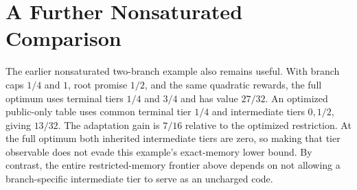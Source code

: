 \section{A Further Nonsaturated Comparison}
The earlier nonsaturated two-branch example also remains useful. With branch caps $1/4$ and $1$, root promise $1/2$, and the same quadratic rewards, the full optimum uses terminal tiers $1/4$ and $3/4$ and has value $27/32$. An optimized public-only table uses common terminal tier $1/4$ and intermediate tiers $0,1/2$, giving $13/32$. The adaptation gain is $7/16$ relative to the optimized restriction. At the full optimum both inherited intermediate tiers are zero, so making that tier observable does not evade this example's exact-memory lower bound. By contrast, the entire restricted-memory frontier above depends on not allowing a branch-specific intermediate tier to serve as an uncharged code.

